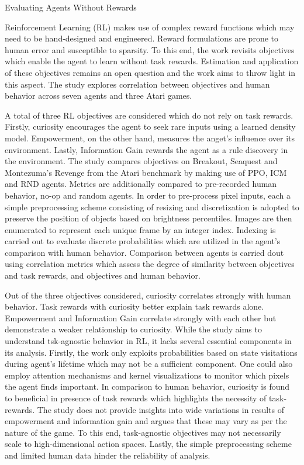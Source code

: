 \documentclass[11pt,letterpaper]{article}
\begin{document}
\begin{center}
  \large{Evaluating Agents Without Rewards}
\end{center}

Reinforcement Learning (RL) makes use of complex reward functions which may need to be hand-designed and engineered. Reward formulations are prone to human error and susceptible to sparsity. To this end, the work revisits objectives which enable the agent to learn without task rewards. Estimation and application of these objectives remains an open question and the work aims to throw light in this aspect. The study explores correlation between objectives and human behavior across seven agents and three Atari games.

A total of three RL objectives are considered which do not rely on task rewards. Firstly, curiosity encourages the agent to seek rare inputs using a learned density model. Empowerment, on the other hand, measures the anget's influence over its environment. Lastly, Information Gain rewards the agent as a rule discovery in the environment. The study compares objectives on Breakout, Seaquest and Montezuma's Revenge from the Atari benchmark by making use of PPO, ICM and RND agents. Metrics are additionally compared to pre-recorded human behavior, no-op and random agents. In order to pre-process pixel inputs, each a simple preprocessing scheme consisting of resizing and discretization is adopted to preserve the position of objects based on brightness percentiles. Images are then enumerated to represent each unique frame by an integer index. Indexing is carried out to evaluate discrete probabilities which are utilized in the agent's comparison with human behavior. Comparison between agents is carried dout using correlation metrics which assess the degree of similarity between objectives and task rewards, and objectives and human behavior. 

Out of the three objectives considered, curiosity correlates strongly with human behavior. Task rewards with curiosity better explain task rewards alone. Empowerment and Information Gain correlate strongly with each other but demonstrate a weaker relationship to curiosity. While the study aims to understand tsk-agnostic behavior in RL, it lacks several essential components in its analysis. Firstly, the work only exploits probabilities based on state visitations during agent's lifetime which may not be a sufficient component. One could also employ attention mechanisms and kernel visualizations to monitor which pixels the agent finds important. In comparison to human behavior, curiosity is found to beneficial in presence of task rewards which highlights the necessity of task-rewards. The study does not provide insights into wide variations in results of empowerment and information gain and argues that these may vary as per the nature of the game. To this end, task-agnostic objectives may not necessarily scale to high-dimensional action spaces. Lastly, the simple preprocessing scheme and limited human data hinder the reliability of analysis. 
\end{document}
